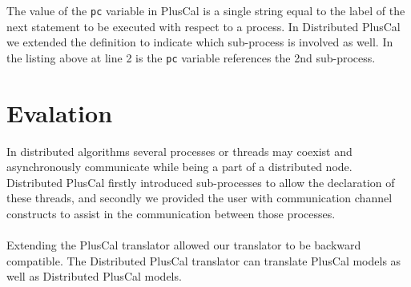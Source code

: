\documentclass[journal]{IEEEtran}
\begin{document}
The value of the \verb|pc| variable in PlusCal is a single string equal to the label of the next statement to be executed with respect to a process. In Distributed PlusCal we extended the definition to indicate which sub-process is involved as well. In the listing above at line 2 is the \verb|pc| variable references the 2nd sub-process.

\section{Evalation}
In distributed algorithms several processes or threads may coexist and asynchronously communicate while being a part of a distributed node. Distributed PlusCal firstly introduced sub-processes to allow the declaration of these threads, and secondly we provided the user with communication channel constructs to assist in the communication between those processes.
\\\\
Extending the PlusCal translator allowed our translator to be backward compatible. The Distributed PlusCal translator can translate PlusCal models as well as Distributed PlusCal models.



\end{document}
